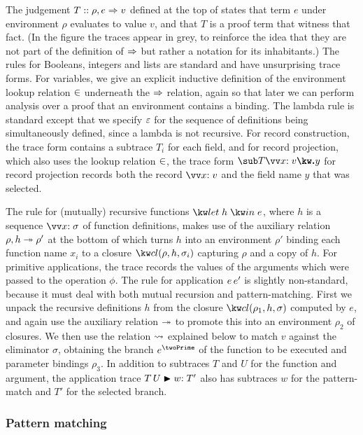 The judgement $T :: \rho, e \Rightarrow v$ defined at the top of  states that term $e$ under environment $\rho$ evaluates to value $v$, and that $T$ is a proof term that witness that fact. (In the figure the traces appear in grey, to reinforce the idea that they are not part of the definition of $\Rightarrow$ but rather a notation for its inhabitants.) The rules for Booleans, integers and lists are standard and have unsurprising trace forms. For variables, we give an explicit inductive definition of the environment lookup relation $\in$ underneath the $\Rightarrow$ relation, again so that later we can perform analysis over a proof that an environment contains a binding. The lambda rule is standard except that we specify $\varepsilon$ for the sequence of definitions being simultaneously defined, since a lambda is not recursive. For record construction, the trace form contains a subtrace $T_i$ for each field, and for record projection, which also uses the lookup relation $\in$, the trace form $\trRecProj{T}{\vec{\bind{x}{v}}}{y}$ for record projection records both the record $\vec{\bind{x}{v}}$ and the field name $y$ that was selected.

The rule for (mutually) recursive functions $\exLetRecMutual{h}{e}$, where $h$ is a sequence $\vec{\bind{x}{\sigma}}$ of function definitions, makes use of the auxiliary relation $\rho, h \twoheadrightarrow \rho'$ at the bottom of  which turns $h$ into an environment $\rho'$ binding each function name $x_i$ to a closure $\exClosure{\rho}{h}{\sigma_i}$ capturing $\rho$ and a copy of $h$. For primitive applications, the trace records the values of the arguments which were passed to the operation $\phi$. The rule for application ${e}\,{e'}$ is slightly non-standard, because it must deal with both mutual recursion and pattern-matching. First we unpack the recursive definitions $h$ from the closure $\exClosure{\rho_1}{h}{\sigma}$ computed by $e$, and again use the auxiliary relation $\twoheadrightarrow$ to promote this into an environment $\rho_2$ of closures. We then use the relation $\rightsquigarrow$ explained below to match $v$ against the eliminator $\sigma$, obtaining the branch $e^\twoPrime$ of the function to be executed and parameter bindings $\rho_3$. In addition to subtraces $T$ and $U$ for the function and argument, the application trace ${T}\,{U} \mathrel{\blacktriangleright} {w{:}\;T'}$ also has subtraces $w$ for the pattern-match and $T'$ for the selected branch.

\subsubsection{Pattern matching}
\label{sec:core-language:pattern-match}

